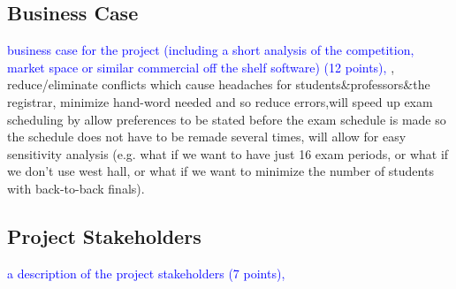 \documentclass[11pt]{article}
\begin{document}
\subsection{Business Case} %
\textcolor{blue}{ business case for the project (including a short analysis of the
 competition, market space or similar commercial off the shelf software) (12 points),}
, reduce/eliminate conflicts which cause headaches for students\&professors\&the registrar, minimize hand-word needed and so reduce errors,will speed up exam scheduling by allow preferences to be stated before the exam schedule is made so the schedule does not have to be remade several times, will allow for easy sensitivity analysis (e.g. what if we want to have just 16 exam periods, or what if we don't use west hall, or what if we want to minimize the number of students with back-to-back finals).
\subsection{Project Stakeholders} %
\textcolor{blue}{a description of the project stakeholders (7 points),}


\end{document}
